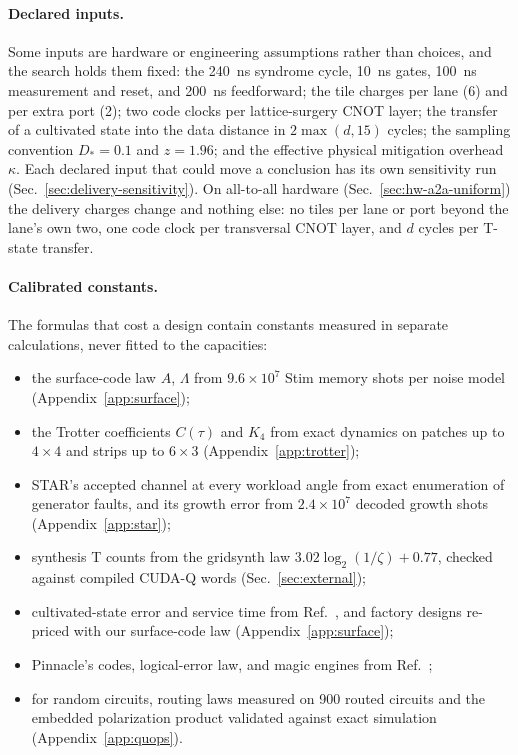 \documentclass[11pt]{article}
\begin{document}
\paragraph{Declared inputs.} Some inputs are hardware or engineering assumptions
rather than choices, and the search holds them fixed: the 240~ns syndrome cycle,
10~ns gates, 100~ns measurement and reset, and 200~ns feedforward; the tile
charges per lane (6) and per extra port (2); two code clocks per lattice-surgery
CNOT layer; the transfer of a cultivated state into the data distance in
$2\max(d,15)$ cycles; the sampling convention $D_*=0.1$ and $z=1.96$; and the
effective physical mitigation overhead $\kappa$. Each declared input that could
move a conclusion has its own sensitivity run (Sec.~\ref{sec:delivery-sensitivity}).
On all-to-all hardware (Sec.~\ref{sec:hw-a2a-uniform}) the delivery charges
change and nothing else: no tiles per lane or port beyond the lane's own two,
one code clock per transversal CNOT layer, and $d$ cycles per T-state transfer.

\paragraph{Calibrated constants.} The formulas that cost a design contain
constants measured in separate calculations, never fitted to the capacities:
\begin{itemize}
\item the surface-code law $A$, $\Lambda$ from $9.6\times10^7$ Stim memory shots per noise
model (Appendix~\ref{app:surface});
\item the Trotter coefficients $C(\tau)$ and $K_4$ from exact dynamics on patches up to
$4\times4$ and strips up to $6\times3$ (Appendix~\ref{app:trotter});
\item STAR's accepted channel at every workload angle from exact enumeration of
generator faults, and its growth error from $2.4\times10^7$ decoded growth shots
(Appendix~\ref{app:star});
\item synthesis T counts from the gridsynth law $3.02\log_2(1/\zeta)+0.77$, checked
against compiled CUDA-Q words (Sec.~\ref{sec:external});
\item cultivated-state error and service time from Ref.~\cite{gidney2024cultivation},
and factory designs re-priced with our surface-code law (Appendix~\ref{app:surface});
\item Pinnacle's codes, logical-error law, and magic engines from
Ref.~\cite{webster2026pinnacle};
\item for random circuits, routing laws measured on 900 routed circuits and the
embedded polarization product validated against exact simulation
(Appendix~\ref{app:quops}).
\end{itemize}
\end{document}
